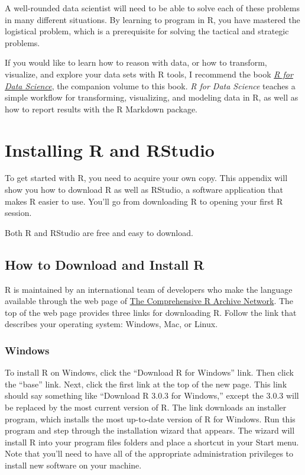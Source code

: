 \documentclass[
  letterpaper,
  DIV=11,
  numbers=noendperiod]{scrbook}
\begin{document}
A well-rounded data scientist will need to be able to solve each of
these problems in many different situations. By learning to program in
R, you have mastered the logistical problem, which is a prerequisite for
solving the tactical and strategic problems.

If you would like to learn how to reason with data, or how to transform,
visualize, and explore your data sets with R tools, I recommend the book
\href{http://r4ds.had.co.nz/}{\emph{R for Data Science}}, the companion
volume to this book. \emph{R for Data Science} teaches a simple workflow
for transforming, visualizing, and modeling data in R, as well as how to
report results with the R Markdown package.

\cleardoublepage
{}
{}
\appendix

\chapter{Installing R and RStudio}\label{sec-appendix-starting}

To get started with R, you need to acquire your own copy. This appendix
will show you how to download R as well as RStudio, a software
application that makes R easier to use. You'll go from downloading R to
opening your first R session.

Both R and RStudio are free and easy to download.

\section{How to Download and Install
R}\label{how-to-download-and-install-r}

R is maintained by an international team of developers who make the
language available through the web page of
\href{http://cran.r-project.org}{The Comprehensive R Archive Network}.
The top of the web page provides three links for downloading R. Follow
the link that describes your operating system: Windows, Mac, or Linux.

\subsection{Windows}\label{windows}

To install R on Windows, click the ``Download R for Windows'' link. Then
click the ``base'' link. Next, click the first link at the top of the
new page. This link should say something like ``Download R 3.0.3 for
Windows,'' except the 3.0.3 will be replaced by the most current version
of R. The link downloads an installer program, which installs the most
up-to-date version of R for Windows. Run this program and step through
the installation wizard that appears. The wizard will install R into
your program files folders and place a shortcut in your Start menu. Note
that you'll need to have all of the appropriate administration
privileges to install new software on your machine.
\end{document}
